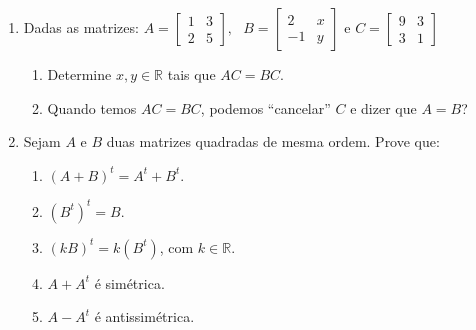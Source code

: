 \documentclass[12pt,a4paper]{article}
\begin{document}
\begin{enumerate}
  \item Dadas as matrizes:
    $A=
      \begin{bmatrix}
        1 & 3 \\
        2 & 5
      \end{bmatrix},
      \ \ \ 
    B=\begin{bmatrix}
      2 & x \\
      -1 & y
    \end{bmatrix}$ e 
    $C=\begin{bmatrix}
      9 & 3 \\
      3 & 1
    \end{bmatrix}$

    \begin{enumerate}
      \item Determine $x , y \in\mathbb{R}$ tais que $AC=BC$.
     \item Quando temos $AC=BC$, podemos ``cancelar'' $C$ e dizer que $A=B$? 
    \end{enumerate}

  \item  Sejam $A$ e $B$ duas matrizes quadradas de mesma ordem. Prove que:
    \begin{enumerate}
      \item $(A+B)^t = A^t + B^t$.
      \item $\left(B^t\right)^t = B$.
      \item $\left(kB\right)^t = k(B^t)$, com $k\in\mathbb{R}$.
      \item $A + A^t$ é simétrica.
      \item $A - A^t$ é antissimétrica.
    \end{enumerate}

  \end{enumerate}
\end{document}
